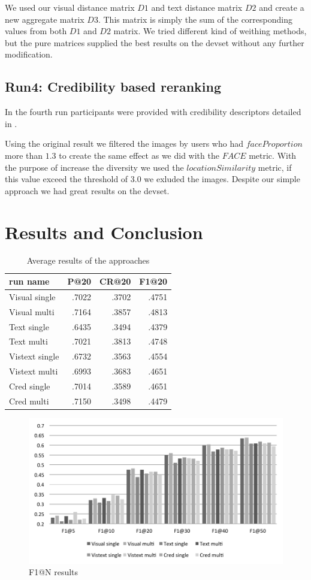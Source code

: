 \documentclass{sig-alternate}
\begin{document}
We used our visual distance matrix $D1$ and text distance matrix $D2$ and create a new aggregate matrix $D3$. This matrix is simply the sum of the corresponding values from both $D1$ and $D2$ matrix. We tried different kind of weithing methods, but the pure matrices supplied the best results on the devset without any further modification.

\subsection{Run4: Credibility based reranking}
In the fourth run participants were provided with credibility descriptors detailed in \cite{Task2015}.

Using the original result we filtered the images by users who had $faceProportion$ more than $1.3$ to create the same effect as we did with the $FACE$ metric. With the purpose of increase the diversity we used the $locationSimilarity$ metric, if this value exceed the threshold of $3.0$ we exluded the images. Despite our simple approach we had great results on the devset.

\section{Results and Conclusion}

\begin{table}[h]
	\centering
\begin{tabular}{|l|r|r|r|}
	\hline 
	run name & P@20 & CR@20 & F1@20\tabularnewline
	\hline 
	\hline 
	Visual single & .7022 & .3702 & .4751\tabularnewline
	\hline 
	Visual multi & .7164 & .3857 & .4813\tabularnewline
	\hline 
	Text single & .6435 & .3494 & .4379\tabularnewline
	\hline 
	Text multi & .7021 & .3813 & .4748\tabularnewline
	\hline 
	Vistext single & .6732 & .3563 & .4554\tabularnewline
	\hline 
	Vistext multi & .6993 & .3683 & .4651\tabularnewline
	\hline 
	Cred single & .7014 & .3589 & .4651\tabularnewline
	\hline 
	Cred multi & .7150 & .3498 & .4479\tabularnewline
	\hline 
\end{tabular}
\label{table:results}
\caption{Average results of the approaches}
\end{table}

\begin{figure}[h]
\includegraphics[width=1.0\linewidth]{f1}
\caption{F1@N results}
\label{fig:f1}
\end{figure}
\end{document}

